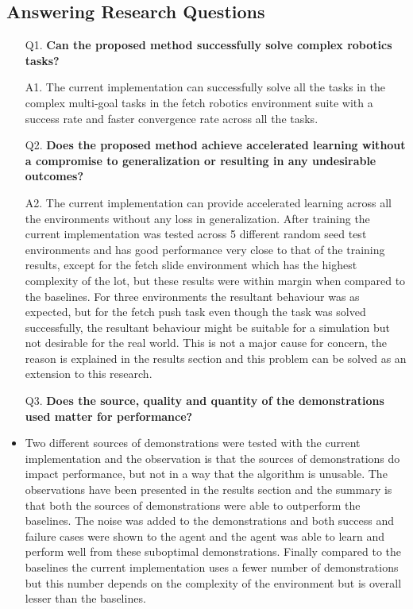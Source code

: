 \subsection{Answering Research Questions}

\begin{itemize}[leftmargin=0.7in]
    \item[Q1.  ] \textbf{Can the proposed method successfully solve complex robotics tasks?} \\

    \item[A1.  ] The current implementation can successfully solve all the tasks in the complex multi-goal tasks in the fetch robotics environment suite with a success rate and faster convergence rate across all the tasks. \\

    \item[Q2.  ] \textbf{Does the proposed method achieve accelerated learning without a compromise to generalization or resulting in any undesirable outcomes?} \\
    
    \item[A2.  ] The current implementation can provide accelerated learning across all the environments without any loss in generalization. After training the current implementation was tested across 5 different random seed test environments and has good performance very close to that of the training results, except for the fetch slide environment which has the highest complexity of the lot, but these results were within margin when compared to the baselines. For three environments the resultant behaviour was as expected, but for the fetch push task even though the task was solved successfully, the resultant behaviour might be suitable for a simulation but not desirable for the real world. This is not a major cause for concern, the reason is explained in the results section and this problem can be solved as an extension to this research. \\
    
    \item[Q3.  ] \textbf{Does the source, quality and quantity of the demonstrations used matter for performance?} \\
    
    \item Two different sources of demonstrations were tested with the current implementation and the observation is that the sources of demonstrations do impact performance, but not in a way that the algorithm is unusable. The observations have been presented in the results section and the summary is that both the sources of demonstrations were able to outperform the baselines. The noise was added to the demonstrations and both success and failure cases were shown to the agent and the agent was able to learn and perform well from these suboptimal demonstrations. Finally compared to the baselines the current implementation uses a fewer number of demonstrations but this number depends on the complexity of the environment but is overall lesser than the baselines. \\


\end{itemize}
